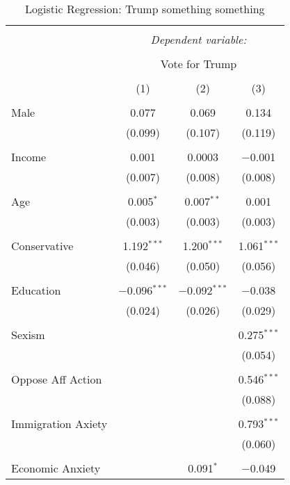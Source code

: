 
\begin{table}[!htbp] \centering 
  \caption{Logistic Regression: Trump something something} 
  \label{} 
\begin{tabular}{@{\extracolsep{5pt}}lccc} 
\\[-1.8ex]\hline 
\hline \\[-1.8ex] 
 & \multicolumn{3}{c}{\textit{Dependent variable:}} \\ 
\cline{2-4} 
\\[-1.8ex] & \multicolumn{3}{c}{Vote for Trump} \\ 
\\[-1.8ex] & (1) & (2) & (3)\\ 
\hline \\[-1.8ex] 
 Male & 0.077 & 0.069 & 0.134 \\ 
  & (0.099) & (0.107) & (0.119) \\ 
  & & & \\ 
 Income & 0.001 & 0.0003 & $-$0.001 \\ 
  & (0.007) & (0.008) & (0.008) \\ 
  & & & \\ 
 Age & 0.005$^{*}$ & 0.007$^{**}$ & 0.001 \\ 
  & (0.003) & (0.003) & (0.003) \\ 
  & & & \\ 
 Conservative & 1.192$^{***}$ & 1.200$^{***}$ & 1.061$^{***}$ \\ 
  & (0.046) & (0.050) & (0.056) \\ 
  & & & \\ 
 Education & $-$0.096$^{***}$ & $-$0.092$^{***}$ & $-$0.038 \\ 
  & (0.024) & (0.026) & (0.029) \\ 
  & & & \\ 
 Sexism &  &  & 0.275$^{***}$ \\ 
  &  &  & (0.054) \\ 
  & & & \\ 
 Oppose Aff Action &  &  & 0.546$^{***}$ \\ 
  &  &  & (0.088) \\ 
  & & & \\ 
 Immigration Axiety &  &  & 0.793$^{***}$ \\ 
  &  &  & (0.060) \\ 
  & & & \\ 
 Economic Anxiety &  & 0.091$^{*}$ & $-$0.049 \\ 

\end{tabular}
\end{table}
